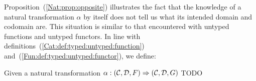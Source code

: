 Proposition~(\ref{Nat:prop:opposite}) illustrates the fact that the knowledge
of a natural transformation $\alpha$ by itself does not tell us what its 
intended domain and codomain are. This situation is similar to that encountered
with untyped functions and untyped functors. In line with
definitions~(\ref{Cat:def:typed:untyped:function}) and~(\ref{Fun:def:typed:untyped:functor}), we define:
\begin{defin}\label{Nat:def:typed:untyped:natural}
    Given a natural transformation $\alpha:(\mbox{$\cal C$},\mbox{$\cal D$},F)\Rightarrow(\mbox{$\cal C$},\mbox{$\cal D$},G)$
    TODO
\end{defin}

